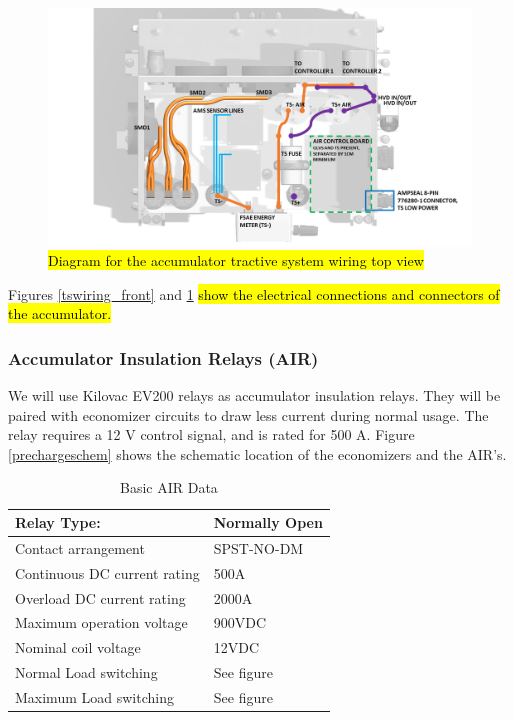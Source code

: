 \documentclass{article}
\DeclareRobustCommand{\hlr}[1]{{\sethlcolor{red}\hl{#1}}}
\begin{document}
            \begin{figure}[H]
                \centering
                \includegraphics[width = 0.5 \textwidth]{TRACTIVE_DIAGRAM_3}
                \caption{\hlr{Diagram for the accumulator tractive system wiring top view }}
                \label{tswiring_top}
            \end{figure}

            Figures \ref{tswiring_front} and \ref{tswiring_top} \hlr{show the electrical connections and connectors of the accumulator. }

        \subsubsection{Accumulator Insulation Relays (AIR)} \label{airs}


            We will use Kilovac EV200 relays as accumulator insulation relays. They will be paired with economizer circuits to draw less current during normal usage. The relay requires a 12 V control signal, and is rated for 500 A. Figure \ref{prechargeschem} shows the schematic location of the economizers and the AIR's.

            \begin{table}[H]
                \centering
                \begin{tabular}{|l|l|}
                    \hline
                    Relay Type: & Normally Open \\ \hline
                    Contact arrangement & SPST-NO-DM \\ \hline
                    Continuous DC current rating & 500A \\ \hline
                    Overload DC current rating & 2000A \\ \hline
                    Maximum operation voltage & 900VDC \\ \hline
                    Nominal coil voltage & 12VDC \\ \hline
                    Normal Load switching & See figure \\ \hline
                    Maximum Load switching & See figure \\ \hline
                \end{tabular}
                \caption{Basic AIR Data}
                \label{air}
            \end{table}
\end{document}
